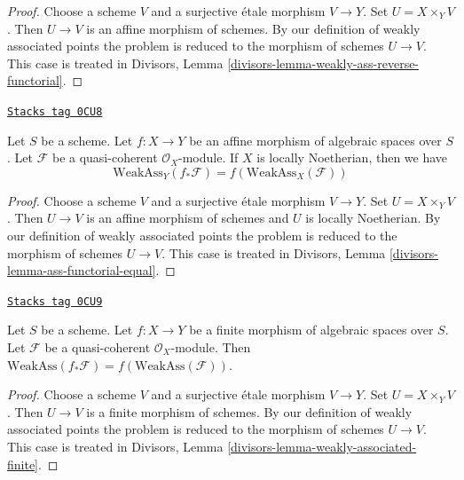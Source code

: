 \begin{proof}
Choose a scheme $V$ and a surjective \'etale morphism $V \to Y$.
Set $U = X \times_Y V$. Then $U \to V$ is an affine morphism
of schemes. By our definition of weakly associated points
the problem is reduced to the morphism of schemes $U \to V$. This case is
treated in Divisors, Lemma \ref{divisors-lemma-weakly-ass-reverse-functorial}.
\end{proof}

\begin{lemma}
\label{spaces-divisors-lemma-ass-functorial-equal}
\href{https://stacks.math.columbia.edu/tag/0CU8}{\texttt{Stacks tag 0CU8}}

Let $S$ be a scheme.
Let $f : X \to Y$ be an affine morphism of algebraic spaces over $S$.
Let $\mathcal{F}$ be a quasi-coherent $\mathcal{O}_X$-module.
If $X$ is locally Noetherian, then we have
$$
\text{WeakAss}_Y(f_*\mathcal{F}) =
f(\text{WeakAss}_X(\mathcal{F}))
$$
\end{lemma}

\begin{proof}
Choose a scheme $V$ and a surjective \'etale morphism $V \to Y$.
Set $U = X \times_Y V$. Then $U \to V$ is an affine morphism
of schemes and $U$ is locally Noetherian.
By our definition of weakly associated points
the problem is reduced to the morphism of schemes $U \to V$. This case is
treated in Divisors, Lemma \ref{divisors-lemma-ass-functorial-equal}.
\end{proof}

\begin{lemma}
\label{spaces-divisors-lemma-weakly-associated-finite}
\href{https://stacks.math.columbia.edu/tag/0CU9}{\texttt{Stacks tag 0CU9}}

Let $S$ be a scheme.
Let $f : X \to Y$ be a finite morphism of algebraic spaces over $S$.
Let $\mathcal{F}$ be a quasi-coherent $\mathcal{O}_X$-module.
Then $\text{WeakAss}(f_*\mathcal{F}) = f(\text{WeakAss}(\mathcal{F}))$.
\end{lemma}

\begin{proof}
Choose a scheme $V$ and a surjective \'etale morphism $V \to Y$.
Set $U = X \times_Y V$. Then $U \to V$ is a finite morphism
of schemes. By our definition of weakly associated points
the problem is reduced to the morphism of schemes $U \to V$. This case is
treated in Divisors, Lemma \ref{divisors-lemma-weakly-associated-finite}.
\end{proof}


